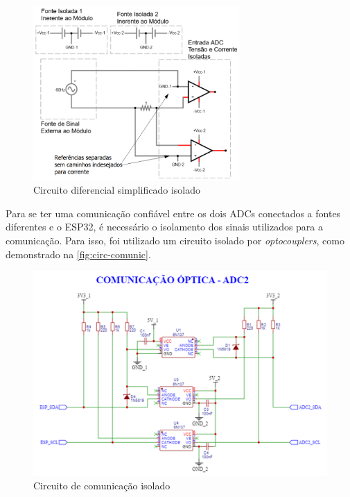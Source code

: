 \begin{figure}[htb!]
    \caption{Circuito diferencial simplificado isolado}
    \label{fig:dif-isolado}
    \includegraphics[width=0.7\textwidth]{figuras/diferencial-ref-separada.png}
    \fonte{}
\end{figure}

Para se ter uma comunicação confiável entre os dois \gls{ADC}s conectados a fontes diferentes e o ESP32, é necessário o isolamento dos sinais utilizados para a comunicação. Para isso, foi utilizado um circuito isolado por \textit{optocouplers}, como demonstrado na \autoref{fig:circ-comunic}.

\begin{figure}[htb!]
    \caption{Circuito de comunicação isolado}
    \label{fig:circ-comunic}
    \includegraphics[width=1.0\textwidth]{figuras/circ-comunic.png}
    \fonte{}
\end{figure}

